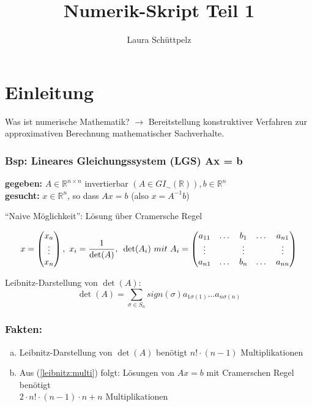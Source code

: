 \documentclass[a4paper]{scrartcl}
\title{Numerik-Skript Teil 1}
\author{Laura Schüttpelz}
\begin{document}
\maketitle

\section{Einleitung}
Was ist numerische Mathematik?
$\rightarrow$ Bereitstellung konstruktiver Verfahren zur 
approximativen Berechnung mathematischer Sachverhalte.

\subsubsection*{Bsp: Lineares Gleichungssystem (LGS) Ax = b}
\textbf{gegeben:} $A \in \mathbb{R}^{n \times n}$ invertierbar 
$(A \in GI_{\sim} (\mathbb{R})), b \in \mathbb{R}^n$ \\
\textbf{gesucht:} $x \in \mathbb{R}^n$, so dass $Ax = b$ (also $x = A^{-1} b$)

"`Naive Möglichkeit"': Lösung über Cramersche Regel

\begin{displaymath}
x = \begin{pmatrix} x_a \\ \vdots \\ x_n \end{pmatrix}, 
~ x_i = \frac{1}{\det (A)},\\~ \det(A_i)~ mit~ 
A_i = \begin{pmatrix} a_{11} & \dots & b_1 & \dots & a_{n1} 
\\ \vdots & & \vdots & & \vdots \\ a_{n1} & \dots & b_n & 
\dots & a_{nn} \end{pmatrix}
\end{displaymath}

Leibnitz-Darstellung von $\det(A)$:
\begin{displaymath}
\det(A) = \sum_{\sigma \in S_n} sign (\sigma) a_{1\sigma(1)} 
\dots a_{n\sigma(n)}
\end{displaymath}

\subsubsection*{Fakten:}
\begin{enumerate}[(a)]
\item\label{leibnitz:multi}
Leibnitz-Darstellung von $\det(A)$ benötigt $n! \cdot (n-1)$ Multiplikationen
\item
Aus (\ref{leibnitz:multi}) folgt: Lösungen von $Ax=b$ mit Cramerschen Regel benötigt \\
$2 \cdot  n!\cdot(n-1) \cdot n + n$ Multiplikationen 
\end{enumerate}
\end{document}

